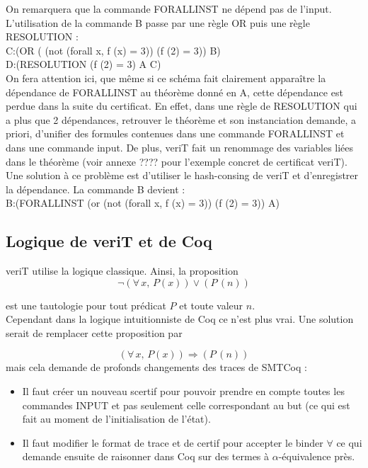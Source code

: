 \documentclass[11pt]{article}
\begin{document}
On remarquera que la commande FORALLINST ne dépend pas de l'input. L'utilisation de la commande B passe par une règle OR puis une règle RESOLUTION : \\ 

C:(OR ( (not (forall x, f (x) = 3)) (f (2) = 3)) B) \\ 
D:(RESOLUTION (f (2) = 3) A C) \\ 

On fera attention ici, que même si ce schéma fait clairement apparaître la dépendance de FORALLINST au théorème donné en A, cette dépendance est perdue dans la suite du certificat. En effet, dans une règle de RESOLUTION qui a plus que 2 dépendances, retrouver le théorème et son instanciation demande, a priori, d'unifier des formules contenues dans une commande FORALLINST et dans une commande input. De plus, veriT fait un renommage des variables liées dans le théorème (voir annexe ???? pour l'exemple concret de certificat veriT). Une solution à ce problème est d'utiliser le hash-consing de veriT et d'enregistrer la dépendance. La commande B devient : \\

B:(FORALLINST (or (not (forall x, f (x) = 3)) (f (2) = 3)) A) 

\subsection{Logique de veriT et de Coq}
veriT utilise la logique classique. Ainsi, la proposition 
\[  \neg (\forall \, x, \, P(x)) \vee (P \, (n)) \]

est une tautologie pour tout prédicat $P$ et toute valeur $n$. \\

Cependant dans la logique intuitionniste de Coq ce n'est plus vrai. Une solution serait de remplacer cette proposition par 

\[   (\forall \, x, \, P(x)) \Rightarrow (P \, (n)) \]
mais cela demande de profonds changements des traces de SMTCoq : 
\begin{itemize}

\item Il faut créer un nouveau scertif pour pouvoir prendre en compte toutes les commandes INPUT et pas seulement celle correspondant au but (ce qui est fait au moment de l'initialisation de l'état).
\item Il faut modifier le format de trace et de certif pour accepter le binder $\forall$ ce qui demande ensuite de raisonner dans Coq sur des termes à $\alpha$-équivalence près.
\end{itemize}
\end{document}
